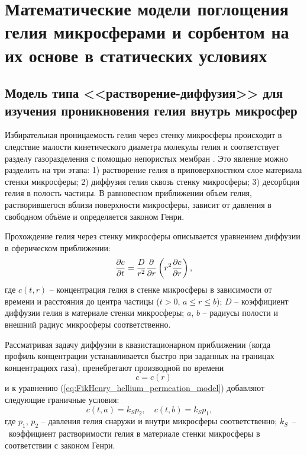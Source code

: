 \chapter{Математические модели поглощения гелия микросферами и сорбентом на их основе в статических условиях}
 \label{section_2}
 
\section{Модель типа <<растворение-диффузия>> для изучения проникновения гелия внутрь микросфер}
 \label{section_2_1}
 
Избирательная проницаемость гелия через стенку микросферы происходит в следствие малости кинетического диаметра молекулы гелия и соответствует разделу газоразделения с помощью непористых мембран \cite{Mulder}. Это явление можно разделить на три этапа: 1) растворение гелия в приповерхностном слое материала стенки микросферы; 2) диффузия гелия сквозь стенку микросферы; 3) десорбция гелия в полость частицы. В равновесном приближении объем гелия, растворившегося вблизи поверхности микросферы, зависит от давления в свободном объёме и определяется законом Генри. 

Прохождение гелия через стенку микросферы описывается уравнением диффузии в сферическом приближении:
\begin{equation}
\label{eq:FikHenry_hellium_permeation_model}
\frac{\partial c}{\partial t}=\frac{D}{r^2}\frac{\partial }{\partial r}\left( r^2 \frac{\partial c}{\partial r} \right),
\end{equation}
где $c(t,r)$ -- концентрация гелия в стенке микросферы в зависимости от времени и расстояния до центра частицы ($t > 0$, $a \leq r \leq b$); $D$ -- коэффициент диффузии гелия в материале стенки микросферы; $a$, $b$ -- радиусы полости и внешний радиус микросферы соответственно. 

Рассматривая задачу диффузии в квазистационарном приближении (когда профиль концентрации устанавливается быстро при заданных на границах концентрациях газа), пренебрегают производной по времени 
\begin{equation}
\label{eq:FikHenry_hellium_permeation_model_quasistat}
c = c(r)
\end{equation}
и к уравнению (\ref{eq:FikHenry_hellium_permeation_model}) добавляют следующие граничные условия:
\begin{equation}
\label{eq:FikHenry_hellium_permeation_model_conditions}
c(t, a)  = k_S p_2,\quad
c(t, b)  = k_S p_1,\quad
\end{equation}
где $p_1$, $p_2$ -- давления гелия снаружи и внутри микросферы соответственно; $k_S$~--~коэффициент растворимости гелия в материале стенки микросферы в соответствии с законом Генри.


